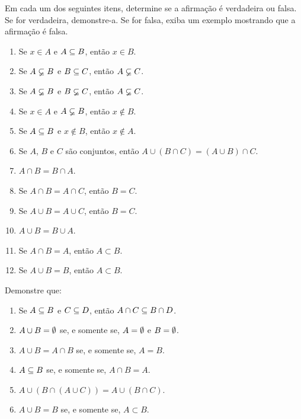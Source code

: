 \documentclass[12pt]{exam}
\begin{document}
    \questao{} Em cada um dos seguintes itens, determine se a afirma\c{c}\~ao \'e
    verdadeira ou falsa. Se for verdadeira, demonstre-a. Se for falsa, exiba um
    exemplo mostrando que a afirma\c{c}\~ao \'e falsa.
    \begin{enumerate}[label={\alph*})]
        \item Se $x \in A$ e $A \subseteq B$, ent\~ao $x \in B$.

        \item Se $A \varsubsetneq B$ e $B \subseteq C$, ent\~ao $A \varsubsetneq C$.

        \item Se $A \varsubsetneq B$ e $B \varsubsetneq C$, ent\~ao $A \varsubsetneq C$.

        \item Se $x \in A$ e $A \varsubsetneq B$, ent\~ao $x \notin B$.

        \item Se $A \subseteq B$ e $x \notin B$, ent\~ao $x \notin A$.

        \item Se $A$, $B$ e $C$ s\~ao conjuntos, ent\~ao $A \cup (B \cap C) = (A \cup B) \cap C$.

        \item $A \cap B = B \cap A$.

        \item Se $A \cap B = A \cap C$, então $B = C$.

        \item Se $A \cup B = A \cup C$, então $B = C$.

        \item $A \cup B = B \cup A$.

        \item Se $A \cap B = A$, então $A \subset B$.

        \item Se $A \cup B = B$, então $A \subset B$.
    \end{enumerate}

    \questao{} Demonstre que:
    \begin{enumerate}[label={\alph*})]
        \item Se $A \subseteq B$ e $C \subseteq D$, ent\~ao $A \cap C \subseteq B \cap D$.

        \item $A \cup B = \emptyset$ se, e somente se, $A = \emptyset$ e $B = \emptyset$.

        \item $A \cup B = A \cap B$ se, e somente se,  $A = B$.

        \item $A \subseteq B$ se, e somente se,  $A \cap B = A$.

        \item $A \cup (B \cap (A \cup C)) = A \cup (B \cap C)$.

        \item $A \cup B = B$ se, e somente se, $A \subset B$.
    \end{enumerate}
\end{document}
